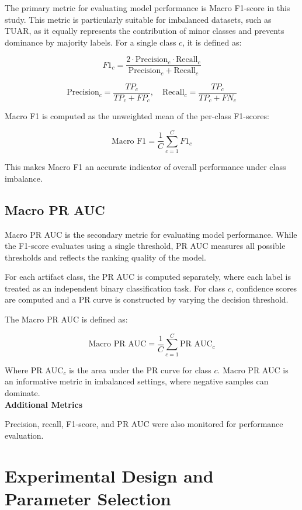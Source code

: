 The primary metric for evaluating model performance is Macro F1-score in this study. This metric is particularly suitable for imbalanced datasets, such as TUAR, as it equally represents the contribution of minor classes and prevents dominance by majority labels. For a single class $c$, it is defined as:

\[
F1_c = \frac{2 \cdot \mathrm{Precision}_c \cdot \mathrm{Recall}_c}{\mathrm{Precision}_c + \mathrm{Recall}_c}
\]

\[
\text{Precision}_c = \frac{TP_c}{TP_c + FP_c}, \quad
\text{Recall}_c = \frac{TP_c}{TP_c + FN_c}
\]

Macro F1 is computed as the unweighted mean of the per-class F1-scores:

\[
\text{Macro F1} = \frac{1}{C} \sum_{c=1}^{C} F1_c
\]

This makes Macro F1 an accurate indicator of overall performance under class imbalance.

\subsection{Macro PR AUC}

Macro PR AUC is the secondary metric for evaluating model performance. While the F1-score evaluates using a single threshold, PR AUC measures all possible thresholds and reflects the ranking quality of the model.

For each artifact class, the PR AUC is computed separately, where each label is treated as an independent binary classification task. For class $c$, confidence scores are computed and a PR curve is constructed by varying the decision threshold.

The Macro PR AUC is defined as:

\[
\text{Macro PR AUC} = \frac{1}{C} \sum_{c=1}^{C} \text{PR AUC}_c
\]

Where $\text{PR AUC}_c$ is the area under the PR curve for class $c$.
Macro PR AUC is an informative metric in imbalanced settings, where negative samples can dominate.\\

\textbf{Additional Metrics}

Precision, recall, F1-score, and PR AUC were also monitored for performance evaluation.

\section{Experimental Design and Parameter Selection}

